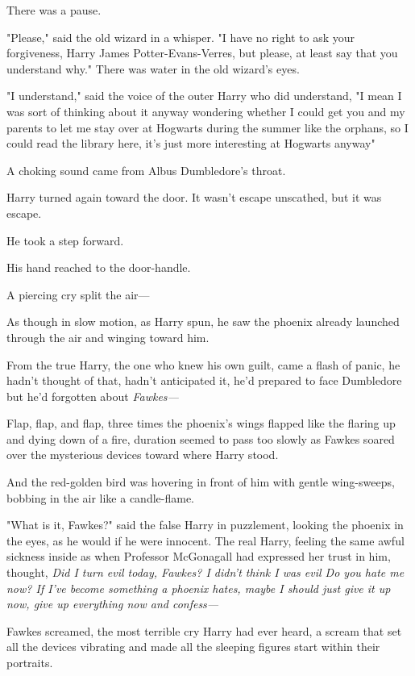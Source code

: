 There was a pause.

"Please," said the old wizard in a whisper. "I have no right to ask your
forgiveness, Harry James Potter-Evans-Verres, but please, at least say that you
understand why." There was water in the old wizard's eyes.

"I understand," said the voice of the outer Harry who did understand, "I
mean{\el} I was sort of thinking about it anyway{\el} wondering whether I
could get you and my parents to let me stay over at Hogwarts during the summer
like the orphans, so I could read the library here, it's just more interesting
at Hogwarts anyway{\el}"

A choking sound came from Albus Dumbledore's throat.

Harry turned again toward the door. It wasn't escape unscathed, but it was
escape.

He took a step forward.

His hand reached to the door-handle.

A piercing cry split the air\mbox{---}

As though in slow motion, as Harry spun, he saw the phoenix already launched
through the air and winging toward him.

From the true Harry, the one who knew his own guilt, came a flash of panic, he
hadn't thought of that, hadn't anticipated it, he'd prepared to face Dumbledore
but he'd forgotten about \emph{Fawkes---}

Flap, flap, and flap, three times the phoenix's wings flapped like the flaring
up and dying down of a fire, duration seemed to pass too slowly as Fawkes
soared over the mysterious devices toward where Harry stood.

And the red-golden bird was hovering in front of him with gentle wing-sweeps,
bobbing in the air like a candle-flame.

"What is it, Fawkes?" said the false Harry in puzzlement, looking the phoenix
in the eyes, as he would if he were innocent. The real Harry, feeling the same
awful sickness inside as when Professor McGonagall had expressed her trust in
him, thought, \emph{Did I turn evil today, Fawkes? I didn't think I was
evil{\el} Do you hate me now? If I've become something a phoenix hates,
maybe I should just give it up now, give up everything now and confess---}

Fawkes screamed, the most terrible cry Harry had ever heard, a scream that set
all the devices vibrating and made all the sleeping figures start within their
portraits.

